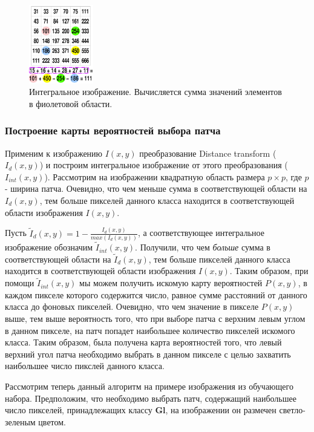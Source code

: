 \begin{figure}[H]
    \centering
    \includegraphics[width=0.25\textwidth]{pics/summedup2.png}
    \caption{Интегральное изображение. Вычисляется сумма значений элементов в фиолетовой области.}
    \label{fig:summed2}
\end{figure}

\subsubsection{Построение карты вероятностей выбора патча}
Применим к изображению $I(x,y)$ преобразование Distance transform ($I_{d}(x, y)$) и построим интегральное изображение от этого преобразования ($I_{int}(x,y)$). Рассмотрим на изображении квадратную область размера $p \times p$, где $p$ - ширина патча. Очевидно, что чем меньше сумма в соответствующей области на $I_{d}(x,y)$,
тем больше пикселей данного класса находится в соответствующей области изображения $I(x,y)$. 
\par Пусть $\tilde{I}_{d}(x,y) = 1 - \frac{I_{d}(x,y)}{max(I_{d}(x,y))}$, а соответствующее интегральное изображение обозначим $\tilde{I}_{int}(x,y)$. Получили, что чем \textit{больше} сумма в соответствующей области на $\tilde{I}_{d}(x,y)$, тем больше пикселей данного класса находится в соответствующей области изображения $I(x,y)$. Таким образом, при помощи $\tilde{I}_{int}(x,y)$ мы можем получить искомую карту вероятностей $P(x,y)$, в каждом пикселе которого содержится число, равное сумме расстояний от данного класса до фоновых пикселей. Очевидно, что чем значение в пикселе $P(x,y)$ выше, тем выше вероятность того, что при выборе патча с верхним левым углом в данном пикселе, на патч попадет наибольшее количество пикселей искомого класса. Таким образом, была получена карта вероятностей того, что левый верхний угол патча необходимо выбрать в данном пикселе с целью захватить наибольшее число пикслей данного класса.
\par Рассмотрим теперь данный алгоритм на примере изображения из обучающего набора. Предположим, что необходимо выбрать патч, содержащий наибольшее число пикселей, принадлежащих классу \textbf{Gl}, на изображении он размечен светло-зеленым цветом.
